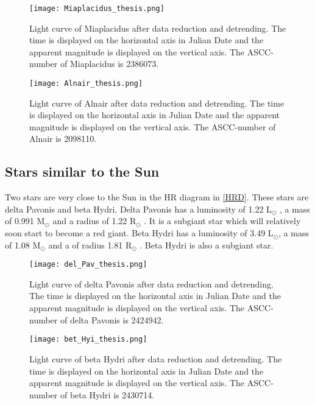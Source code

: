 \documentclass{aa}
\begin{document}
\begin{enumerate}
\begin{figure}
    \centering
    \texttt{[image: Miaplacidus\_thesis.png]}
    \caption{Light curve of Miaplacidus after data reduction and detrending. The time is displayed on the horizontal axis in Julian Date and the apparent magnitude is displayed on the vertical axis. The ASCC-number of Miaplacidus is 2386073.}
    \label{Miaplacidus}
\end{figure}

\begin{figure}
    \centering
    \texttt{[image: Alnair\_thesis.png]}
    \caption{Light curve of Alnair after data reduction and detrending. The time is displayed on the horizontal axis in Julian Date and the apparent magnitude is displayed on the vertical axis. The ASCC-number of Alnair is 2098110.}
    \label{Alnair}
\end{figure}
\end{enumerate}

\subsection{Stars similar to the Sun} 
Two stars are very close to the Sun in the HR diagram in \ref{HRD}. These stars are delta Pavonis and beta Hydri. Delta Pavonis has a luminosity of 1.22 L$_\odot$ \citep{Bruntt_2010}, a mass of 0.991 M$_\odot$ and a radius of 1.22 R$_\odot$ \citep{2008yCat..21680297T}. It is a subgiant star which will relatively soon start to become a red giant. Beta Hydri has a luminosity of 3.49 L$_\odot$, a mass of 1.08 M$_\odot$ and a of radius 1.81 R$_\odot$ \citep{Brand_o_2011}. Beta Hydri is also a subgiant star. 

\begin{figure}
    \centering
    \texttt{[image: del\_Pav\_thesis.png]}
    \caption{Light curve of delta Pavonis after data reduction and detrending. The time is displayed on the horizontal axis in Julian Date and the apparent magnitude is displayed on the vertical axis. The ASCC-number of delta Pavonis is 2424942.}
    \label{del_Pav}
\end{figure}

\begin{figure}
    \centering
    \texttt{[image: bet\_Hyi\_thesis.png]}
    \caption{Light curve of beta Hydri after data reduction and detrending. The time is displayed on the horizontal axis in Julian Date and the apparent magnitude is displayed on the vertical axis. The ASCC-number of beta Hydri is 2430714.}
    \label{bet_Hyi}
  \end{figure}
\end{document}
